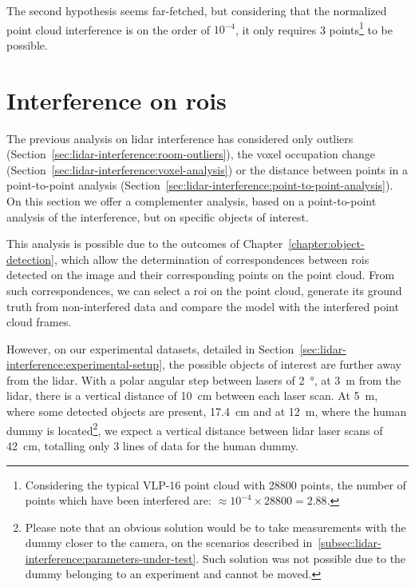 The second hypothesis seems far-fetched, but considering that the normalized point cloud interference is on the order of $10^{-4}$, it only requires 3 points\footnote{Considering the typical VLP-16 point cloud with 28800 points, the number of points which have been interfered are: $\approx 10^{-4} \times 28800 = 2.88$.} to be possible.




\section{Interference on \acp{roi}}
\label{sec:lidar-interference:interference-roi}
The previous analysis on \ac{lidar} interference has considered only outliers (Section~\ref{sec:lidar-interference:room-outliers}), the voxel occupation change (Section~\ref{sec:lidar-interference:voxel-analysis}) or the distance between points in a point-to-point analysis (Section~\ref{sec:lidar-interference:point-to-point-analysis}). On this section we offer a complementer analysis, based on a point-to-point analysis of the interference, but on specific objects of interest.

This analysis is possible due to the outcomes of Chapter~\ref{chapter:object-detection}, which allow the determination of correspondences between \acp{roi} detected on the image and their corresponding points on the point cloud. From such correspondences, we can select a \ac{roi} on the point cloud, generate its ground truth from non-interfered data and compare the model with the interfered point cloud frames.

However, on our experimental datasets, detailed in Section~\ref{sec:lidar-interference:experimental-setup}, the possible objects of interest are further away from the \ac{lidar}. With a polar angular step between lasers of \SI{2}{\degree}, at \SI{3}{\meter} from the \ac{lidar}, there is a vertical distance of \SI{10}{\centi\meter} between each laser scan. At \SI{5}{\meter}, where some detected objects are present, \SI{17.4}{\centi\meter} and at \SI{12}{\meter}, where the human dummy is located\footnote{Please note that an obvious solution would be to take measurements with the dummy closer to the camera, on the scenarios described in~\ref{subsec:lidar-interference:parameters-under-test}. Such solution was not possible due to the dummy belonging to an experiment and cannot be moved.}, we expect a vertical distance between \ac{lidar} \ac{laser} scans of \SI{42}{\centi\meter}, totalling only 3 lines of data for the human dummy.

